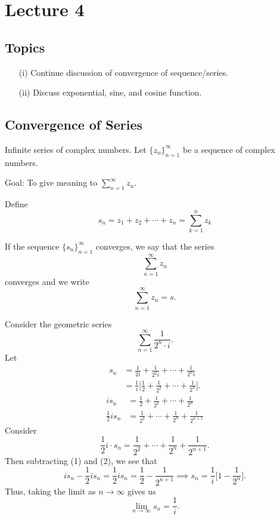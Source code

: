 \documentclass[a4paper]{report}
\begin{document}
\section{Lecture 4}

\subsection{Topics}

\begin{enumerate}
    \item[(i)] Continue discussion of convergence of sequence/series.
    \item[(ii)] Discuss exponential, sine, and cosine function.
\end{enumerate}


\subsection{Convergence of Series}

Infinite series of complex numbers. Let \( \{ {z}_{n} \}_{n=1}^{\infty } \) be a sequence of complex numbers. 

Goal: To give meaning to \( \sum_{ n=1  }^{ \infty  } {z}_{n} \).

Define \[ {s}_{n} = {z}_{1} + {z}_{2} + \cdots + {z}_{n} = \sum_{ k = 1  }^{ n } {z}_{k} \] 
\begin{definition}
    If the sequence \( \{ {s}_{n} \}_{n=1}^{\infty } \) converges, we say that the series  
    \[  \sum_{ n=1  }^{ \infty  } {z}_{n} \]
    converges and we write
    \[  \sum_{ n = 1  }^{  \infty   } {z}_{n} = s. \]
\end{definition}

\begin{eg}
    Consider the geometric series
    \[  \sum_{ n=1  }^{ \infty  } \frac{ 1  }{ 2^{n} \cdot i  }. \]
    Let 
    \begin{align*}
    {s}_{n} &= \frac{ 1 }{ 2 i  }  + \frac{ 1 }{ 2^{2} i   } + \cdots + \frac{ 1  }{ 2^{n} i  }   \\
            &=  \frac{ 1 }{ i }  \Big[ \frac{ 1 }{ 2 }  + \frac{ 1 }{ 2^{2} }  + \cdots + \frac{ 1 }{ 2^{n} } \Big].
\end{align*}
\begin{align*}
    i {s}_{n} &= \frac{ 1 }{ 2 }  + \frac{ 1 }{ 2^{2}  } + \cdots + \frac{ 1 }{ 2^{n} } \tag{1}  \\
    \frac{ 1 }{ 2 }  i {s}_{n} &= \frac{ 1 }{ 2^{2}  }  + \cdots + \frac{ 1 }{ 2^{n}  } + \frac{ 1 }{ 2^{n+1} } \tag{2}
\end{align*}
Consider
\[  \frac{ 1 }{ 2 }  i \cdot {s}_{n} = \frac{ 1 }{ 2^{2}  }  + \cdots + \frac{ 1 }{ 2^{n} }  + \frac{ 1 }{  2^{n+1} }.  \]
Then subtracting (1) and (2), we see that
\[ i {s}_{n} - \frac{ 1 }{ 2 }  i {s}_{n} =   \frac{ 1 }{ 2 }  i {s}_{n} = \frac{ 1 }{ 2 }  - \frac{ 1 }{ 2^{n+1} } \implies {s}_{n} = \frac{ 1 }{ i }  \Big[ 1 - \frac{ 1 }{ 2^{n} } \Big].   \]
Thus, taking the limit as \( n \to \infty   \) gives us 
\[  \lim_{ n \to \infty  }  {s}_{n} = \frac{ 1 }{ i }. \]
\end{eg}
\end{document}
